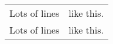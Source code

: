 ﻿\documentclass{article}
\begin{document}
\begin{longtable}{@{*}r||p{1in}@{*}}
    \hline
    Lots of lines&like this.\\
    Lots of lines&like this.\\
\end{longtable}
\end{document}
